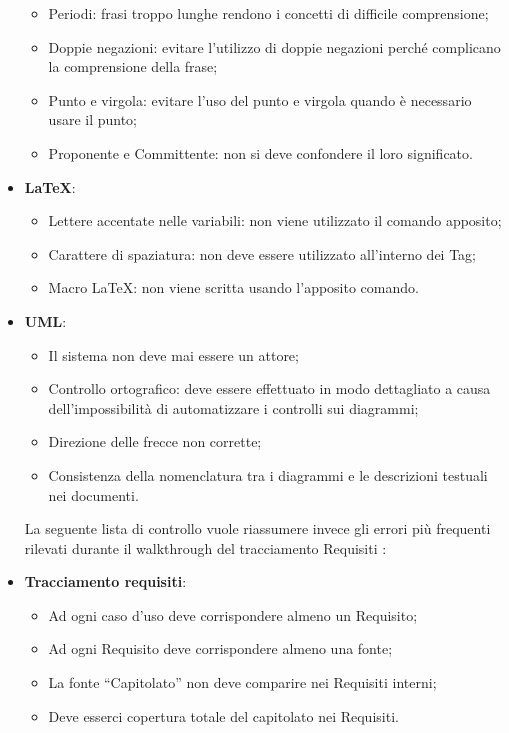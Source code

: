 \begin{itemize}
\begin{itemize}
\item Periodi: frasi troppo lunghe rendono i concetti di difficile comprensione;
\item Doppie negazioni: evitare l’utilizzo di doppie negazioni perché complicano la
comprensione della frase;
\item Punto e virgola: evitare l’uso del punto e virgola quando è necessario usare
il punto;
\item Proponente e Committente: non si deve confondere il loro significato.
\end{itemize}
\item \textbf{\LaTeX}:
\begin{itemize}
\item Lettere accentate nelle variabili: non viene utilizzato il comando apposito;
\item Carattere di spaziatura: non deve essere utilizzato all’interno dei Tag;
\item Macro \LaTeX: non viene scritta usando l'apposito comando.
\end{itemize}
\item \textbf{UML}:
\begin{itemize}
\item Il sistema non deve mai essere un attore;
\item Controllo ortografico: deve essere effettuato in modo dettagliato a causa dell'impossibilità di automatizzare i controlli sui diagrammi;
\item Direzione delle frecce non corrette;
\item Consistenza della nomenclatura tra i diagrammi e le descrizioni testuali nei documenti.
\end{itemize}
La seguente lista di controllo vuole riassumere invece gli errori più frequenti rilevati
durante il walkthrough del tracciamento Requisiti :

\item \textbf{Tracciamento requisiti}:
\begin{itemize}

\item Ad ogni caso d’uso deve corrispondere almeno un Requisito;
\item Ad ogni Requisito deve corrispondere almeno una fonte;
\item La fonte “Capitolato” non deve comparire nei Requisiti interni;
\item Deve esserci copertura totale del capitolato nei Requisiti.

\end{itemize}
\end{itemize}
